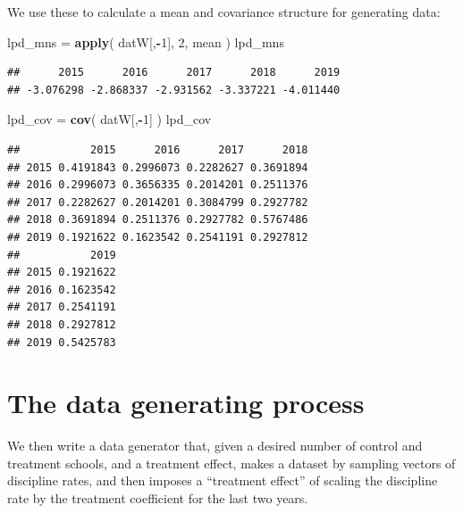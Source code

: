 \documentclass[
]{book}
\newenvironment{Shaded}{\begin{snugshade}}{\end{snugshade}}
\newcommand{\DecValTok}[1]{\textcolor[rgb]{0.00,0.00,0.81}{#1}}
\newcommand{\FunctionTok}[1]{\textcolor[rgb]{0.13,0.29,0.53}{\textbf{#1}}}
\newcommand{\NormalTok}[1]{#1}
\newcommand{\OtherTok}[1]{\textcolor[rgb]{0.56,0.35,0.01}{#1}}
\newcommand{\SpecialCharTok}[1]{\textcolor[rgb]{0.81,0.36,0.00}{\textbf{#1}}}
\begin{document}
We use these to calculate a mean and covariance structure for generating data:

\begin{Shaded}
\begin{Highlighting}[]
\NormalTok{lpd\_mns }\OtherTok{=} \FunctionTok{apply}\NormalTok{( datW[,}\SpecialCharTok{{-}}\DecValTok{1}\NormalTok{], }\DecValTok{2}\NormalTok{, mean )}
\NormalTok{lpd\_mns}
\end{Highlighting}
\end{Shaded}

\begin{verbatim}
##      2015      2016      2017      2018      2019 
## -3.076298 -2.868337 -2.931562 -3.337221 -4.011440
\end{verbatim}

\begin{Shaded}
\begin{Highlighting}[]
\NormalTok{lpd\_cov }\OtherTok{=} \FunctionTok{cov}\NormalTok{( datW[,}\SpecialCharTok{{-}}\DecValTok{1}\NormalTok{] )}
\NormalTok{lpd\_cov}
\end{Highlighting}
\end{Shaded}

\begin{verbatim}
##           2015      2016      2017      2018
## 2015 0.4191843 0.2996073 0.2282627 0.3691894
## 2016 0.2996073 0.3656335 0.2014201 0.2511376
## 2017 0.2282627 0.2014201 0.3084799 0.2927782
## 2018 0.3691894 0.2511376 0.2927782 0.5767486
## 2019 0.1921622 0.1623542 0.2541191 0.2927812
##           2019
## 2015 0.1921622
## 2016 0.1623542
## 2017 0.2541191
## 2018 0.2927812
## 2019 0.5425783
\end{verbatim}

\section{The data generating process}\label{the-data-generating-process}

We then write a data generator that, given a desired number of control and treatment schools, and a treatment effect, makes a dataset by sampling vectors of discipline rates, and then imposes a ``treatment effect'' of scaling the discipline rate by the treatment coefficient for the last two years.
\end{document}
